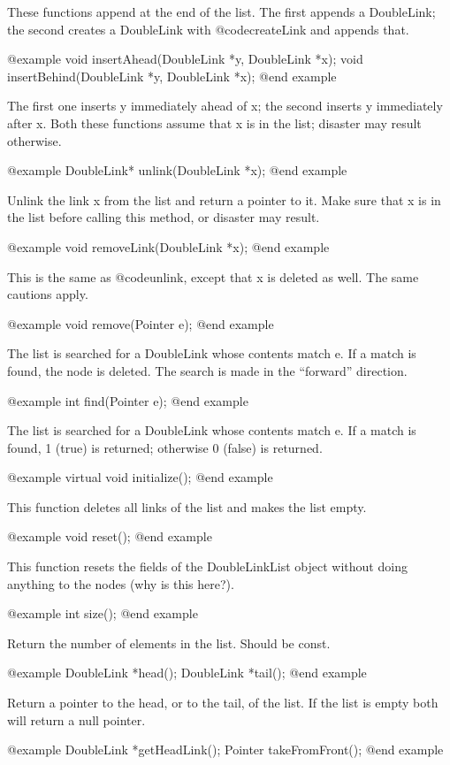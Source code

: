 These functions append at the end of the list.  The first appends
a DoubleLink; the second creates a DoubleLink with @code{createLink}
and appends that.

@example
void insertAhead(DoubleLink *y, DoubleLink *x);
void insertBehind(DoubleLink *y, DoubleLink *x);
@end example

The first one inserts y immediately ahead of x; the second
inserts y immediately after x.  Both these functions assume
that x is in the list; disaster may result otherwise.

@example
DoubleLink* unlink(DoubleLink *x);
@end example

Unlink the link x from the list and return a pointer to it.
Make sure that x is in the list before calling this method,
or disaster may result.

@example
void removeLink(DoubleLink *x);
@end example

This is the same as @code{unlink}, except that x is deleted
as well.  The same cautions apply.

@example
void remove(Pointer e);
@end example

The list is searched for a DoubleLink whose contents match e.  If
a match is found, the node is deleted.  The search is made in the
``forward'' direction.

@example
int find(Pointer e);
@end example

The list is searched for a DoubleLink whose contents match e.  If
a match is found, 1 (true) is returned; otherwise 0 (false) is
returned.

@example
virtual void initialize();
@end example

This function deletes all links of the list and makes the list empty.

@example
void reset();
@end example

This function resets the fields of the DoubleLinkList object without
doing anything to the nodes (why is this here?).

@example
int size();
@end example

Return the number of elements in the list.  Should be const.

@example
DoubleLink *head();
DoubleLink *tail();
@end example

Return a pointer to the head, or to the tail, of the list.  If
the list is empty both will return a null pointer.

@example
DoubleLink *getHeadLink();
Pointer takeFromFront();
@end example

